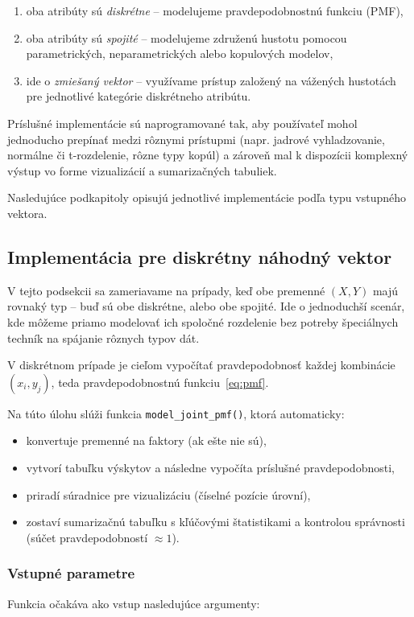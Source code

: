 \begin{enumerate}
  \item oba atribúty sú \textit{diskrétne} – modelujeme pravdepodobnostnú funkciu (PMF),
  \item oba atribúty sú \textit{spojité} – modelujeme združenú hustotu pomocou parametrických, neparametrických alebo kopulových modelov,
  \item ide o \textit{zmiešaný vektor} – využívame prístup založený na vážených hustotách pre jednotlivé kategórie diskrétneho atribútu.
\end{enumerate}

Príslušné implementácie sú naprogramované tak, aby používateľ mohol jednoducho prepínať medzi rôznymi prístupmi (napr. jadrové vyhladzovanie, normálne či t-rozdelenie, rôzne typy kopúl) a zároveň mal k dispozícii komplexný výstup vo forme vizualizácií a sumarizačných tabuliek.

Nasledujúce podkapitoly opisujú jednotlivé implementácie podľa typu vstupného vektora.

\subsection{Implementácia pre diskrétny náhodný vektor}\label{subsec:homo_vector_implementation}

V tejto podsekcii sa zameriavame na prípady, keď obe premenné $(X, Y)$ majú rovnaký typ – buď sú obe diskrétne, alebo obe spojité. Ide o jednoduchší scenár, kde môžeme priamo modelovať ich spoločné rozdelenie bez potreby špeciálnych techník na spájanie rôznych typov dát.

V diskrétnom prípade je cieľom vypočítať pravdepodobnosť každej kombinácie $(x_i, y_j)$, teda pravdepodobnostnú funkciu~\ref{eq:pmf}.

Na túto úlohu slúži funkcia \texttt{model\_joint\_pmf()}, ktorá automaticky:
\begin{itemize}
  \item konvertuje premenné na faktory (ak ešte nie sú),
  \item vytvorí tabuľku výskytov a následne vypočíta príslušné pravdepodobnosti,
  \item priradí súradnice pre vizualizáciu (číselné pozície úrovní),
  \item zostaví sumarizačnú tabuľku s kľúčovými štatistikami a kontrolou správnosti (súčet pravdepodobností $\approx 1$).
\end{itemize}

\subsubsection{Vstupné parametre}
Funkcia očakáva ako vstup nasledujúce argumenty:

